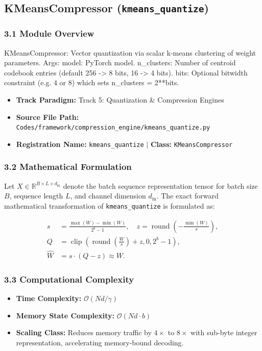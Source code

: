 \subsection{KMeansCompressor (\texttt{kmeans\_quantize})}
\label{sec:app_module_kmeans_quantize}

\subsubsection*{3.1 Module Overview}
KMeansCompressor: Vector quantization via scalar k-means clustering of weight parameters.  Args:     model: PyTorch model.     n\_clusters: Number of centroid codebook entries (default 256 -> 8 bits, 16 -> 4 bits).     bits: Optional bitwidth constraint (e.g. 4 or 8) which sets n\_clusters = 2**bits.
\begin{itemize}
    \item \textbf{Track Paradigm:} Track 5: Quantization & Compression Engines
    \item \textbf{Source File Path:} \texttt{Codes/framework/compression\_engine/kmeans\_quantize.py}
    \item \textbf{Registration Name:} \texttt{kmeans\_quantize} $\mid$ \textbf{Class:} \texttt{KMeansCompressor}
\end{itemize}

\subsubsection*{3.2 Mathematical Formulation}
Let $X \in \mathbb{R}^{B \times L \times d_{\text{in}}}$ denote the batch sequence representation tensor for batch size $B$, sequence length $L$, and channel dimension $d_{\text{in}}$. The exact forward mathematical transformation of \texttt{kmeans\_quantize} is formulated as:

\begin{align}
s &= \frac{\max(W) - \min(W)}{2^b - 1}, \quad z = \operatorname{round}\left(-\frac{\min(W)}{s}\right), \\
Q &= \operatorname{clip}\left(\operatorname{round}\left(\frac{W}{s}\right) + z, 0, 2^b - 1\right), \\
\hat{W} &= s \cdot (Q - z) \approx W.
\end{align}


\subsubsection*{3.3 Computational Complexity}
\begin{itemize}
    \item \textbf{Time Complexity:} $\mathcal{O}(N d / \gamma)$
    \item \textbf{Memory State Complexity:} $\mathcal{O}(N d \cdot b)$
    \item \textbf{Scaling Class:} Reduces memory traffic by $4\times$ to $8\times$ with sub-byte integer representation, accelerating memory-bound decoding.
\end{itemize}

